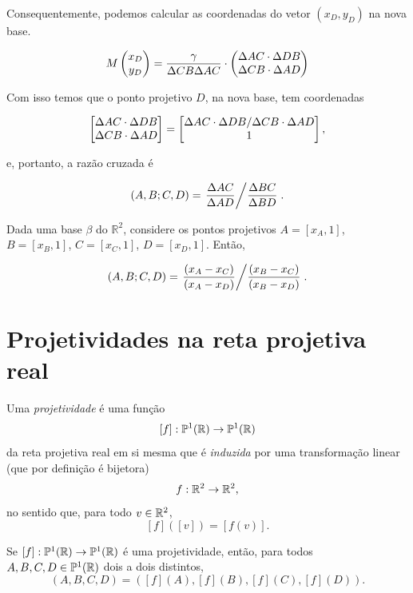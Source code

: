 \begin{sol}
Consequentemente, podemos calcular as coordenadas do vetor \((x_D, y_D)\) na nova base.

\begin{equation}
	 M \begin{pmatrix} x_D \\ y_D \\  \end{pmatrix} =  \frac{\gamma}{\Delta CB \Delta AC} \cdot \begin{pmatrix} \Delta AC \cdot \Delta DB \\ \Delta CB \cdot \Delta AD \\  \end{pmatrix}
\end{equation}


Com isso temos que o ponto projetivo $D$, na nova base, tem coordenadas

\begin{equation}
	 \begin{bmatrix} \Delta AC \cdot \Delta DB \\ \Delta CB \cdot \Delta AD \\  \end{bmatrix} = \begin{bmatrix} \Delta AC \cdot \Delta DB / \Delta CB \cdot \Delta AD \\ 1 \\  \end{bmatrix},
\end{equation}

e, portanto, a razão cruzada é

\begin{equation}
	 (A, B; C, D) = \left. \frac{\Delta AC}{\Delta AD} \middle/ \frac{\Delta BC}{\Delta BD}\right..
\end{equation}

\end{sol}

\begin{cor}
Dada uma base \(\beta\) do \(\mathbb{R}^2\), considere os pontos projetivos $A = [x_A,1]$, $B = [x_B,1]$, $C = [x_C,1]$, $D = [x_D,1]$.
Então,

\begin{equation}
	 (A, B; C, D) = \left. \frac{(x_A - x_C)}{(x_A - x_D)} \middle/ \frac{(x_B - x_C)}{(x_B - x_D)}\right..
\end{equation}

\end{cor}

\section{Projetividades na reta projetiva real}

\begin{defn}
Uma \emph{projetividade} é uma função 
\[[f]:\mathbb{P}^1(\mathbb{R})\to \mathbb{P}^1(\mathbb{R})\]
da reta projetiva real em si mesma que é \emph{induzida} por uma transformação linear (que por definição é bijetora) \[f:\mathbb{R}^2\to \mathbb{R}^2,\]
no sentido que, para todo $v\in \mathbb{R}^2$, 
\[[f]([v]) = [f(v)].\]
\end{defn}

\begin{thm}
Se $[f]:\mathbb{P}^1(\mathbb{R}) \to \mathbb{P}^1(\mathbb{R})$ é uma projetividade, então, para todos $A,B,C,D \in \mathbb{P}^1(\mathbb{R})$ dois a dois distintos, 
\[(A,B,C,D) = ([f](A),[f](B),[f](C),[f](D)).\]
\end{thm}

